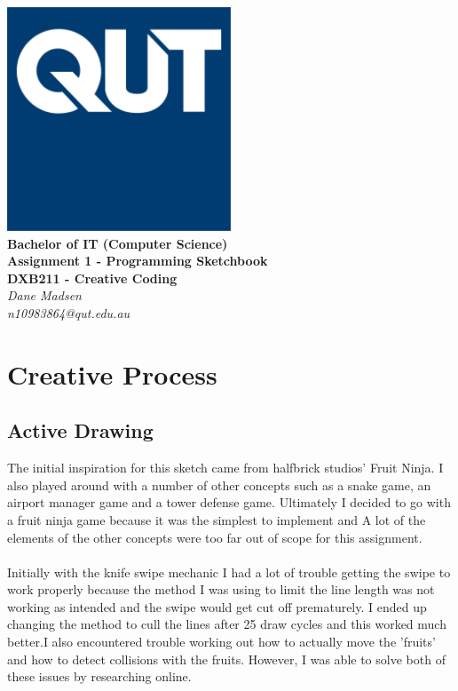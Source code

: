 \documentclass[12pt,a4paper]{article}
\begin{document}
	\begin{titlepage}
		\begin{center}
			\includegraphics[width=0.5\textwidth]{QUT.jpg}\\
			[0.03\textheight]  
			\Large\textbf{Bachelor of IT (Computer Science)}\\
			\Large\textbf{Assignment 1 - Programming Sketchbook}\\
			\large\textbf{DXB211 - Creative Coding}\\
			[0.02\textheight]
			\large\textsl{Dane Madsen}\\
			\large\textsl{n10983864@qut.edu.au}
		\end{center}
		
	\end{titlepage}

	\section{Creative Process}
		\subsection{Active Drawing}
			The initial inspiration for this sketch came from halfbrick studios' Fruit Ninja.
			I also played around with a number of other concepts such as a snake game, an airport 
			manager game and a tower defense game. Ultimately I decided to go with a fruit ninja 
			game because it was the simplest to implement and A lot of the elements of the other 
			concepts were too far out of scope for this assignment.\\\\Initially with the knife 
			swipe mechanic I had a lot of trouble getting the swipe to work properly because the 
			method I was using to limit the line length was not working as intended and the swipe 
			would get cut off prematurely. I ended up changing the method to cull the lines after 
			25 draw cycles and this worked much better.I also encountered trouble working out 
			how to actually move the 'fruits' and how to detect collisions with the fruits. However, 
			I was able to solve both of these issues by researching online.
		
\end{document}
